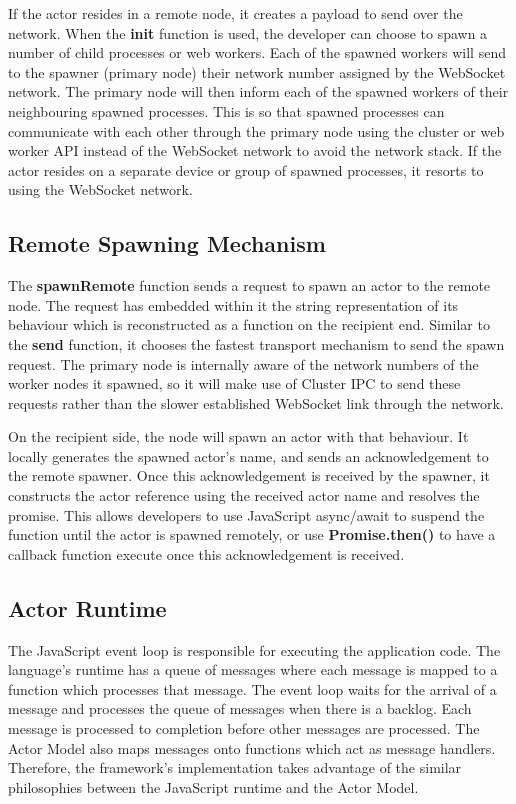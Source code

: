 \documentclass[12pt, a4paper]{report}
\theoremstyle{definition}
\theoremstyle{definition}%
\theoremstyle{definition}%
\theoremstyle{definition}%
\theoremstyle{definition}%
\theoremstyle{definition}%
\begin{document}
If the actor resides in a remote node, it creates a payload to send over the network. When the \textbf{init} function is used, the developer can choose to spawn a number of child processes or web workers. Each of the spawned workers will send to the spawner (primary node) their network number assigned by the WebSocket network. The primary node will then inform each of the spawned workers of their neighbouring spawned processes. This is so that spawned processes can communicate with each other through the primary node using the cluster or web worker API instead of the WebSocket network to avoid the network stack. If the actor resides on a separate device or group of spawned processes, it resorts to using the WebSocket network.
\subsection{Remote Spawning Mechanism}
The \textbf{spawnRemote} function sends a request to spawn an actor to the remote node. The request has embedded within it the string representation of its behaviour which is reconstructed as a function on the recipient end. Similar to the \textbf{send} function, it chooses the fastest transport mechanism to send the spawn request. The primary node is internally aware of the network numbers of the worker nodes it spawned, so it will make use of Cluster IPC to send these requests rather than the slower established WebSocket link through the network.

On the recipient side, the node will spawn an actor with that behaviour. It locally generates the spawned actor's name, and sends an acknowledgement to the remote spawner. Once this acknowledgement is received by the spawner, it constructs the actor reference using the received actor name and resolves the promise. This allows developers to use JavaScript async/await to suspend the function until the actor is spawned remotely, or use \textbf{Promise.then()} to have a callback function execute once this acknowledgement is received.
\subsection{Actor Runtime}
The JavaScript event loop is responsible for executing the application code. The language's runtime has a queue of messages where each message is mapped to a function which processes that message. The event loop waits for the arrival of a message and processes the queue of messages when there is a backlog. Each message is processed to completion before other messages are processed. The Actor Model also maps messages onto functions which act as message handlers. Therefore, the framework's implementation takes advantage of the similar philosophies between the JavaScript runtime and the Actor Model.
\end{document}
